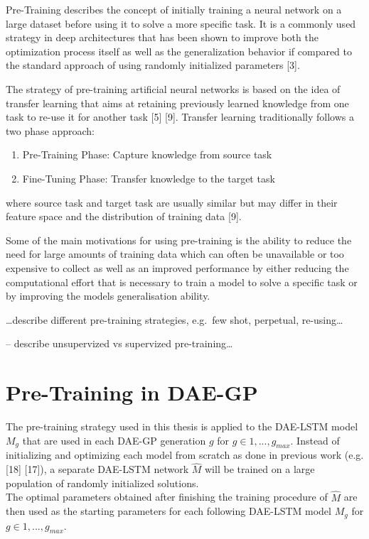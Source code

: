 \documentclass[
  11pt,
]{article}
\providecommand{\tightlist}{%
  \setlength{\itemsep}{0pt}\setlength{\parskip}{0pt}}
\begin{document}
Pre-Training describes the concept of initially training a neural
network on a large dataset before using it to solve a more specific
task. It is a commonly used strategy in deep architectures that has been
shown to improve both the optimization process itself as well as the
generalization behavior if compared to the standard approach of using
randomly initialized parameters {[}3{]}.

The strategy of pre-training artificial neural networks is based on the
idea of transfer learning that aims at retaining previously learned
knowledge from one task to re-use it for another task {[}5{]} {[}9{]}.
Transfer learning traditionally follows a two phase approach:

\begin{enumerate}
\def\labelenumi{\arabic{enumi}.}
\tightlist
\item
  Pre-Training Phase: Capture knowledge from source task
\item
  Fine-Tuning Phase: Transfer knowledge to the target task
\end{enumerate}

where source task and target task are usually similar but may differ in
their feature space and the distribution of training data {[}9{]}.

Some of the main motivations for using pre-training is the ability to
reduce the need for large amounts of training data which can often be
unavailable or too expensive to collect as well as an improved
performance by either reducing the computational effort that is
necessary to train a model to solve a specific task or by improving the
models generalisation ability.

\ldots describe different pre-training strategies, e.g.~few shot,
perpetual, re-using\ldots{}

-- describe unsupervized vs supervized pre-training\ldots{}

\hypertarget{pre-training-in-dae-gp}{%
\section{Pre-Training in DAE-GP}\label{pre-training-in-dae-gp}}

The pre-training strategy used in this thesis is applied to the DAE-LSTM
model \(M_g\) that are used in each DAE-GP generation \(g\) for
\(g\in{1,...,g_{max}}\). Instead of initializing and optimizing each
model from scratch as done in previous work (e.g. {[}18{]} {[}17{]}), a
separate DAE-LSTM network \(\hat{M}\) will be trained on a large
population of randomly initialized solutions.\\
The optimal parameters obtained after finishing the training procedure
of \(\hat{M}\) are then used as the starting parameters for each
following DAE-LSTM model \(M_g\) for \(g\in{1,...,g_{max}}\).
\end{document}
